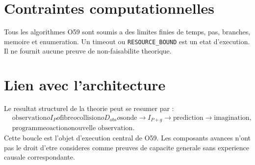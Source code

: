 \documentclass[11pt,a4paper]{article}
\begin{document}
\section{Contraintes computationnelles}
Tous les algorithmes O59 sont soumis a des limites finies de temps, pas, branches, memoire et enumeration. Un timeout ou \texttt{RESOURCE\_BOUND} est un etat d'execution. Il ne fournit aucune preuve de non-faisabilite theorique.

\section{Lien avec l'architecture}
Le resultat structurel de la theorie peut se resumer par :
\[\begin{aligned}
&\text{observation}	o I_P	o\text{fibre}	o\text{collision}	o D_{obs}	o\text{sonde}\to I_{P+g}\to\text{prediction}\to\text{imagination},\\
&\text{programme}	o\text{action}	o\text{nouvelle observation}.\end{aligned}\]
Cette boucle est l'objet d'execution central de O59. Les composants avances n'ont pas le droit d'etre consideres comme preuves de capacite generale sans experience causale correspondante.
\end{document}
